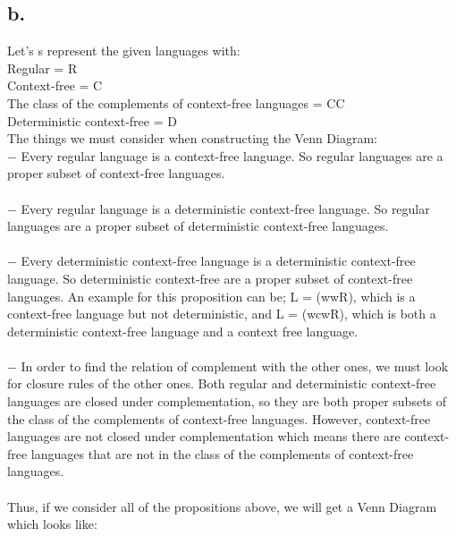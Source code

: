 \documentclass[12pt]{article}
\begin{document}
\subsection*{b.} 

Let's s represent the given languages with:\\

Regular = R\\
Context-free = C\\
The class of the complements of context-free languages = CC\\
Deterministic context-free = D\\


The things we must consider when constructing the Venn Diagram:\\
$-$ Every regular language is a context-free language. So regular languages are a proper subset of context-free languages.\\
\\
$-$ Every regular language is a deterministic context-free language. So regular languages are a proper subset of deterministic context-free languages.\\
\\
$-$ Every  deterministic context-free language is a deterministic context-free language. So deterministic context-free are a proper subset of context-free languages. An example for this proposition can be; L = (wwR), which is a context-free language but not deterministic, and L = (wcwR), which is both a deterministic context-free language and a context free language.\\
\\
$-$ In order to find the relation of complement with the other ones, we must look for closure rules of the other ones. Both regular and deterministic context-free languages are closed under complementation, so they are both proper subsets of the class of the complements of context-free languages. However,  context-free languages are not closed under complementation which means there are context-free languages that are not in the class of the complements of context-free languages.\\
\\
Thus, if we consider all of the propositions above, we will get a Venn Diagram which looks like:\\
\end{document}
